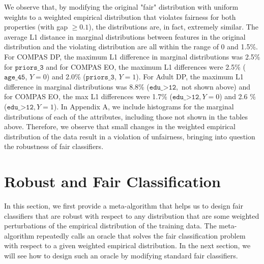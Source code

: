 \documentclass[11pt]{article}
\begin{document}
We observe that, by modifying the original "fair" distribution with uniform weights to a weighted empirical distribution that violates fairness for both properties (with gap $\ge 0.1$), the distributions are, in fact, extremely similar. The average L1 distance in marginal distributions between features in the original distribution and the violating distribution are all within the range of 0 and 1.5\%. For COMPAS DP, the maximum L1 difference in marginal distributions was 2.5\% for $\texttt{priors\_3}$ and for COMPAS EO, the maximum L1 differences were 2.5\% ($\texttt{age\_45}$, $Y = 0$) and 2.0\% ($\texttt{priors\_3}$, $Y = 1$). For Adult DP, the maximum L1 difference in marginal distributions was 8.8\% ($\texttt{edu\_>12},$ not shown above) and for COMPAS EO, the max L1 differences were 1.7\% ($\texttt{edu\_>12}, Y = 0$) and 2.6 \% ($\texttt{edu\_>12}, Y = 1$). In Appendix A, we include histograms for the marginal distributions of each of the attributes, including those not shown in the tables above. Therefore, we observe that small changes in the weighted empirical distribution of the data result in a violation of unfairness, bringing into question the robustness of fair classifiers. 

\section{Robust and Fair Classification}
In this section, we first provide a meta-algorithm that helps us to design  fair classifiers that are robust with respect to
any distribution that are some weighted perturbations of the empirical distribution of the training data. The meta-algorithm repeatedly calls an oracle that solves the fair classification problem with respect to a given weighted empirical distribution. In the next section, we will see how to design such an oracle by modifying standard fair classifiers.
\end{document}

